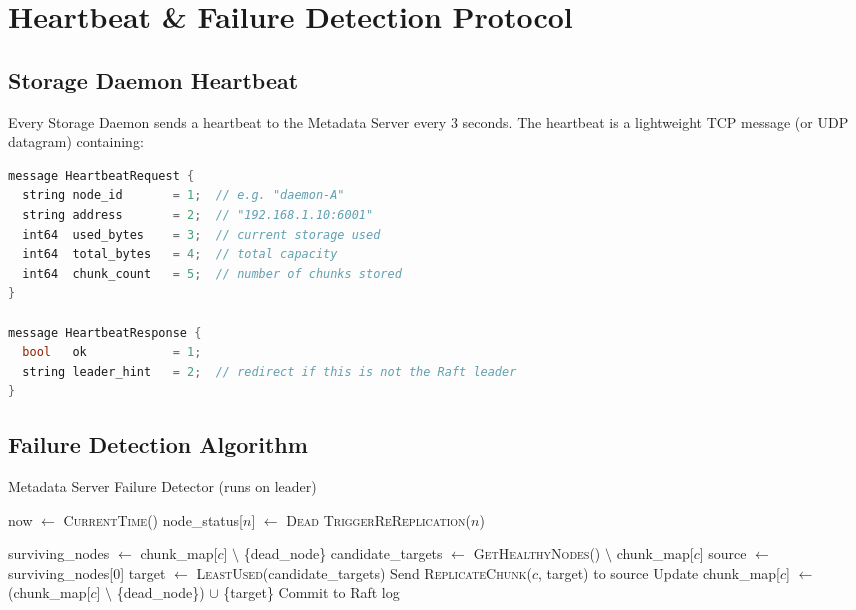 \documentclass[12pt,a4paper]{article}
\begin{document}
\section{Heartbeat \& Failure Detection Protocol}

\subsection{Storage Daemon Heartbeat}

Every Storage Daemon sends a heartbeat to the Metadata Server every 3 seconds. The heartbeat is a lightweight TCP message (or UDP datagram) containing:

\begin{lstlisting}[language=c, caption={Heartbeat protobuf}]
message HeartbeatRequest {
  string node_id       = 1;  // e.g. "daemon-A"
  string address       = 2;  // "192.168.1.10:6001"
  int64  used_bytes    = 3;  // current storage used
  int64  total_bytes   = 4;  // total capacity
  int64  chunk_count   = 5;  // number of chunks stored
}

message HeartbeatResponse {
  bool   ok            = 1;
  string leader_hint   = 2;  // redirect if this is not the Raft leader
}
\end{lstlisting}

\subsection{Failure Detection Algorithm}

\begin{algorithm}
\caption{Metadata Server Failure Detector (runs on leader)}
\begin{algorithmic}[1]
 
  \State now $\leftarrow$ \textsc{CurrentTime}()
        \State node\_status[$n$] $\leftarrow$ \textsc{Dead}
        \State \textsc{TriggerReReplication}($n$)
      \EndIf
    \EndIf
  \EndFor
\EndProcedure

    \State surviving\_nodes $\leftarrow$ chunk\_map[$c$] $\setminus$ \{dead\_node\}
    \State candidate\_targets $\leftarrow$ \textsc{GetHealthyNodes}() $\setminus$ chunk\_map[$c$]
      \State source $\leftarrow$ surviving\_nodes[0]
      \State target $\leftarrow$ \textsc{LeastUsed}(candidate\_targets)
      \State Send \textsc{ReplicateChunk}($c$, target) to source
      \State Update chunk\_map[$c$] $\leftarrow$ (chunk\_map[$c$] $\setminus$ \{dead\_node\}) $\cup$ \{target\}
      \State Commit to Raft log
    \EndIf
  \EndFor
\EndProcedure
\end{algorithmic}
\end{algorithm}
\end{document}
